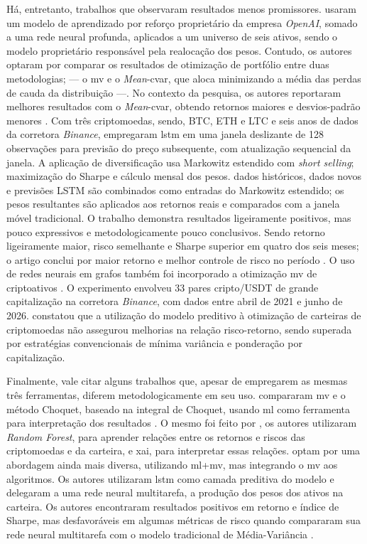 Há, entretanto, trabalhos que observaram resultados menos promissores.  usaram um modelo de aprendizado por reforço proprietário da empresa \textit{OpenAI}, somado a uma rede neural profunda, aplicados a um universo de seis ativos, sendo o modelo proprietário responsável pela realocação dos pesos. Contudo, os autores optaram por comparar os resultados de otimização de portfólio entre duas metodologias; --- o \acs{mv} e o \textit{Mean}-\acs{cvar}, que aloca minimizando a média das perdas de cauda da distribuição ---. No contexto da pesquisa, os autores reportaram melhores resultados com o \textit{Mean}-\acs{cvar}, obtendo retornos maiores e desvios-padrão menores \cite{cui2023portfolio}. Com três criptomoedas, sendo, BTC, ETH e LTC e seis anos de dados da corretora \textit{Binance},  empregaram \ac{lstm} em uma janela deslizante de 128 observações para previsão do preço subsequente, com atualização sequencial da janela. A aplicação de diversificação usa Markowitz estendido com \textit{short selling}; maximização do Sharpe e cálculo mensal dos pesos. dados históricos, dados novos e previsões LSTM são combinados como entradas do Markowitz estendido; os pesos resultantes são aplicados aos retornos reais e comparados com a janela móvel tradicional. O trabalho demonstra resultados ligeiramente positivos, mas pouco expressivos e metodologicamente pouco conclusivos. Sendo retorno ligeiramente maior, risco semelhante e Sharpe superior em quatro dos seis meses; o artigo conclui por maior retorno e melhor controle de risco no período \cite{xu2025cryptocurrency}. O uso de redes neurais em grafos também foi incorporado a otimização \acs{mv} de criptoativos \cite{mba2026regime}. O experimento envolveu 33 pares cripto/USDT de grande capitalização na corretora \textit{Binance}, com dados entre abril de 2021 e junho de 2026.  constatou que a utilização do modelo preditivo à otimização de carteiras de criptomoedas não assegurou melhorias na relação risco-retorno, sendo superada por estratégias convencionais de mínima variância e ponderação por capitalização.

Finalmente, vale citar alguns trabalhos que, apesar de empregarem as mesmas três ferramentas, diferem metodologicamente em seu uso.  compararam \acs{mv} e o método Choquet, baseado na integral de Choquet, usando \acs{ml} como ferramenta para interpretação dos resultados \cite{franco2025integrating}. O mesmo foi feito por , os autores utilizaram \textit{Random Forest}, para aprender relações entre os retornos e riscos das criptomoedas e da carteira, e \ac{xai}, para interpretar essas relações.  optam por uma abordagem ainda mais diversa, utilizando \acs{ml}+\acs{mv}, mas integrando o \acs{mv} aos algoritmos. Os autores utilizaram \acs{lstm} como camada preditiva do modelo e delegaram a uma rede neural multitarefa, a produção dos pesos dos ativos na carteira. Os autores encontraram resultados positivos em retorno e índice de Sharpe, mas desfavoráveis em algumas métricas de risco quando compararam sua rede neural multitarefa com o modelo tradicional de Média-Variância \cite{chen2025multitask}.


